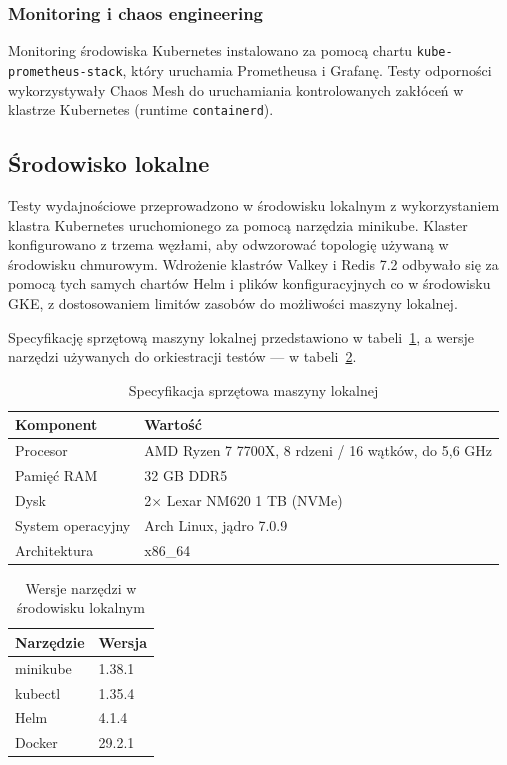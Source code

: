 \subsubsection{Monitoring i chaos engineering}

Monitoring środowiska Kubernetes instalowano za pomocą chartu \texttt{kube-prometheus-stack}, który uruchamia Prometheusa i Grafanę. Testy odporności wykorzystywały Chaos Mesh do uruchamiania kontrolowanych zakłóceń w klastrze Kubernetes (runtime \texttt{containerd}).

\subsection{Środowisko lokalne}\label{subsec:srodowisko_lokalne}

Testy wydajnościowe przeprowadzono w środowisku lokalnym z wykorzystaniem klastra Kubernetes uruchomionego za pomocą narzędzia minikube. Klaster konfigurowano z trzema węzłami, aby odwzorować topologię używaną w środowisku chmurowym. Wdrożenie klastrów Valkey i Redis 7.2 odbywało się za pomocą tych samych chartów Helm i plików konfiguracyjnych co w środowisku GKE, z dostosowaniem limitów zasobów do możliwości maszyny lokalnej.

Specyfikację sprzętową maszyny lokalnej przedstawiono w tabeli~\ref{tab:spec_lokalna}, a wersje narzędzi używanych do orkiestracji testów --- w tabeli~\ref{tab:narzedzia_lokalne}.

\begin{table}[H]
\centering
\caption{Specyfikacja sprzętowa maszyny lokalnej}
\label{tab:spec_lokalna}
\begin{tabularx}{\textwidth}{p{4.0cm}X}
\toprule
\textbf{Komponent} & \textbf{Wartość} \\
\midrule
Procesor & AMD Ryzen 7 7700X, 8 rdzeni / 16 wątków, do 5{,}6 GHz \\
Pamięć RAM & 32 GB DDR5 \\
Dysk & 2$\times$ Lexar NM620 1 TB (NVMe) \\
System operacyjny & Arch Linux, jądro 7.0.9 \\
Architektura & x86\_64 \\
\bottomrule
\end{tabularx}
\end{table}

\begin{table}[H]
\centering
\caption{Wersje narzędzi w środowisku lokalnym}
\label{tab:narzedzia_lokalne}
\begin{tabularx}{\textwidth}{p{4.0cm}X}
\toprule
\textbf{Narzędzie} & \textbf{Wersja} \\
\midrule
minikube & 1.38.1 \\
kubectl & 1.35.4 \\
Helm & 4.1.4 \\
Docker & 29.2.1 \\
\bottomrule
\end{tabularx}
\end{table}

